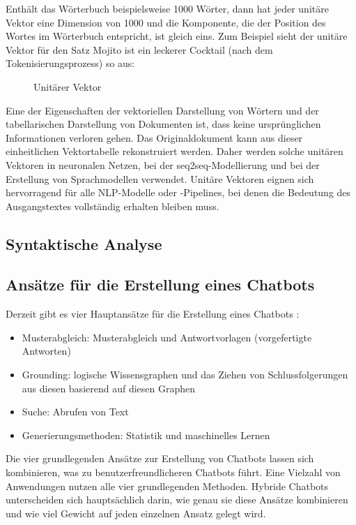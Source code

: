 Enthält das Wörterbuch beispielsweise 1000 Wörter, dann hat jeder unitäre Vektor eine Dimension von 1000 und die Komponente, die der Position des Wortes im Wörterbuch entspricht, ist gleich eins.
Zum Beispiel sieht der unitäre Vektor für den Satz \glqq Mojito ist ein leckerer Cocktail\grqq{} (nach dem Tokenisierungsprozess) so aus:
\begin{figure}[H]
    \centering
    \caption{\label{figure:Unitaere_Vektoe}Unitärer Vektor}
\end{figure}
\noindent
Eine der Eigenschaften der vektoriellen Darstellung von Wörtern und der tabellarischen Darstellung von Dokumenten ist, dass keine ursprünglichen Informationen verloren gehen. 
Das Originaldokument kann aus dieser einheitlichen Vektortabelle rekonstruiert werden. 
Daher werden solche unitären Vektoren in neuronalen Netzen, bei der \ac{seq2seq}-Modellierung und bei der Erstellung von Sprachmodellen verwendet. 
Unitäre Vektoren eignen sich hervorragend für alle \ac{NLP}-Modelle oder -Pipelines, bei denen die Bedeutung des Ausgangstextes vollständig erhalten bleiben muss.
\subsection{Syntaktische Analyse}
\subsection{Ansätze für die Erstellung eines Chatbots}\label{sec:ansaetze_erstellung_chatbots}
Derzeit gibt es vier Hauptansätze für die Erstellung eines Chatbots \cite{lane_natural_2019}:
\begin{itemize}
    \item Musterabgleich: Musterabgleich und Antwortvorlagen (vorgefertigte Antworten)
    \item Grounding: logische Wissensgraphen und das Ziehen von Schlussfolgerungen aus diesen basierend auf diesen Graphen
    \item Suche: Abrufen von Text
    \item Generierungsmethoden: Statistik und maschinelles Lernen
\end{itemize}
Die vier grundlegenden Ansätze zur Erstellung von Chatbots lassen sich kombinieren, was zu benutzerfreundlicheren Chatbots führt. 
Eine Vielzahl von Anwendungen nutzen alle vier grundlegenden Methoden. 
Hybride Chatbots unterscheiden sich hauptsächlich darin, wie genau sie diese Ansätze kombinieren und wie viel Gewicht auf jeden einzelnen Ansatz gelegt wird.
